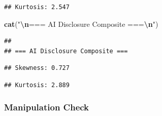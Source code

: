 \documentclass[
]{article}
\newenvironment{Shaded}{\begin{snugshade}}{\end{snugshade}}
\newcommand{\AttributeTok}[1]{\textcolor[rgb]{0.13,0.29,0.53}{#1}}
\newcommand{\ConstantTok}[1]{\textcolor[rgb]{0.56,0.35,0.01}{#1}}
\newcommand{\DecValTok}[1]{\textcolor[rgb]{0.00,0.00,0.81}{#1}}
\newcommand{\FunctionTok}[1]{\textcolor[rgb]{0.13,0.29,0.53}{\textbf{#1}}}
\newcommand{\NormalTok}[1]{#1}
\newcommand{\SpecialCharTok}[1]{\textcolor[rgb]{0.81,0.36,0.00}{\textbf{#1}}}
\newcommand{\StringTok}[1]{\textcolor[rgb]{0.31,0.60,0.02}{#1}}
\begin{document}
\begin{verbatim}
## Kurtosis: 2.547
\end{verbatim}

\begin{Shaded}
\begin{Highlighting}[]
\FunctionTok{cat}\NormalTok{(}\StringTok{"}\SpecialCharTok{\textbackslash{}n}\StringTok{=== AI Disclosure Composite ===}\SpecialCharTok{\textbackslash{}n}\StringTok{"}\NormalTok{)}
\end{Highlighting}
\end{Shaded}

\begin{verbatim}
## 
## === AI Disclosure Composite ===
\end{verbatim}

\begin{Shaded}
\end{Shaded}

\begin{verbatim}
## Skewness: 0.727
\end{verbatim}

\begin{Shaded}
\end{Shaded}

\begin{verbatim}
## Kurtosis: 2.889
\end{verbatim}

\subsubsection{Manipulation Check}\label{manipulation-check}
\end{document}
